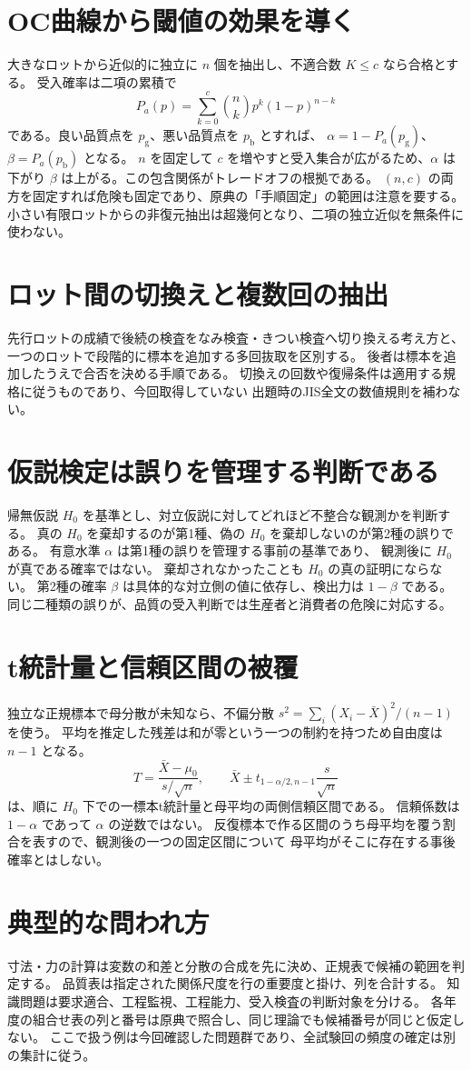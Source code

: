 \section{OC曲線から閾値の効果を導く}
\label{theory:quality:oc}
大きなロットから近似的に独立に \(n\) 個を抽出し、不適合数 \(K\le c\) なら合格とする。
受入確率は二項の累積で
\[
 P_a(p)=\sum_{k=0}^c {n\choose k}p^k(1-p)^{n-k}
\]
である。良い品質点を \(p_{\mathrm g}\)、悪い品質点を \(p_{\mathrm b}\) とすれば、
\(\alpha=1-P_a(p_{\mathrm g})\)、\(\beta=P_a(p_{\mathrm b})\) となる。
\(n\) を固定して \(c\) を増やすと受入集合が広がるため、\(\alpha\) は下がり
\(\beta\) は上がる。この包含関係がトレードオフの根拠である。
\((n,c)\) の両方を固定すれば危険も固定であり、原典の「手順固定」の範囲は注意を要する。
小さい有限ロットからの非復元抽出は超幾何となり、二項の独立近似を無条件に使わない。
\cite{quality_nist_oc}

\section{ロット間の切換えと複数回の抽出}
\label{theory:quality:switching}
先行ロットの成績で後続の検査をなみ検査・きつい検査へ切り換える考え方と、
一つのロットで段階的に標本を追加する多回抜取を区別する。
後者は標本を追加したうえで合否を決める手順である。
切換えの回数や復帰条件は適用する規格に従うものであり、今回取得していない
出題時のJIS全文の数値規則を補わない。\cite{quality_nist_sampling}

\section{仮説検定は誤りを管理する判断である}
\label{theory:quality:hypothesis}
帰無仮説 \(H_0\) を基準とし、対立仮説に対してどれほど不整合な観測かを判断する。
真の \(H_0\) を棄却するのが第1種、偽の \(H_0\) を棄却しないのが第2種の誤りである。
有意水準 \(\alpha\) は第1種の誤りを管理する事前の基準であり、
観測後に \(H_0\) が真である確率ではない。
棄却されなかったことも \(H_0\) の真の証明にならない。
第2種の確率 \(\beta\) は具体的な対立側の値に依存し、検出力は \(1-\beta\) である。
同じ二種類の誤りが、品質の受入判断では生産者と消費者の危険に対応する。
\cite{quality_nist_sampling}

\section{t統計量と信頼区間の被覆}
\label{theory:quality:t_interval}
独立な正規標本で母分散が未知なら、不偏分散
\(s^2=\sum_i(X_i-\bar X)^2/(n-1)\) を使う。
平均を推定した残差は和が零という一つの制約を持つため自由度は \(n-1\) となる。
\[
 T=\frac{\bar X-\mu_0}{s/\sqrt n},\qquad
 \bar X\pm t_{1-\alpha/2,n-1}\frac{s}{\sqrt n}
\]
は、順に \(H_0\) 下での一標本t統計量と母平均の両側信頼区間である。
信頼係数は \(1-\alpha\) であって \(\alpha\) の逆数ではない。
反復標本で作る区間のうち母平均を覆う割合を表すので、観測後の一つの固定区間について
母平均がそこに存在する事後確率とはしない。\cite{stat_nist_interval}

\section{典型的な問われ方}
寸法・力の計算は変数の和差と分散の合成を先に決め、正規表で候補の範囲を判定する。
品質表は指定された関係尺度を行の重要度と掛け、列を合計する。
知識問題は要求適合、工程監視、工程能力、受入検査の判断対象を分ける。
各年度の組合せ表の列と番号は原典で照合し、同じ理論でも候補番号が同じと仮定しない。
ここで扱う例は今回確認した問題群であり、全試験回の頻度の確定は別の集計に従う。
